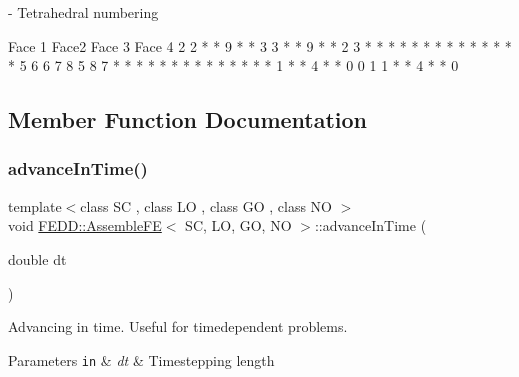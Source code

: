 \begin{DoxyVerb}- Tetrahedral numbering

            Face 1          Face2               Face 3            Face 4
                2      2 * * 9 * * 3        3 * * 9 * * 2            3
                *      *          *          *          *           * *
                *      *        *             *        *          *   *
          5     6      6      7                8      5         8     7
                *      *    *                   *    *        *       *
                *      *  *                      *  *       *         *
    1 * * 4 * * 0       0                         1       1 * * 4 * * 0
\end{DoxyVerb}
 



\subsection{Member Function Documentation}
\mbox{\label{classFEDD_1_1AssembleFE_aa291b30d2a3f78705b2a7722a1a04d96}} 
\subsubsection{\texorpdfstring{advance\+In\+Time()}{advanceInTime()}}
{\footnotesize\ttfamily template$<$class SC , class LO , class GO , class NO $>$ \\
void \hyperlink{classFEDD_1_1AssembleFE}{F\+E\+D\+D\+::\+Assemble\+FE}$<$ SC, LO, GO, NO $>$\+::advance\+In\+Time (\begin{DoxyParamCaption}\item[{double}]{dt }\end{DoxyParamCaption})}



Advancing in time. Useful for timedependent problems. 


\begin{DoxyParams}[1]{Parameters}
\mbox{\tt in}  & {\em dt} & Timestepping length \\
\hline
\end{DoxyParams}
\mbox{\label{classFEDD_1_1AssembleFE_a33e83a1eb6656a74609dfbfaf3fae474}} 
